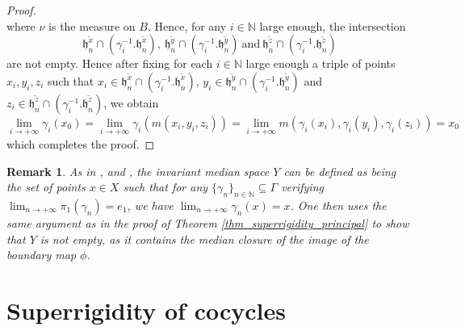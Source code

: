 \documentclass{amsart}
\numberwithin{equation}{section}
\newtheorem{rmk}[thm]{Remark}
\newcommand{\hh}{\mathfrak{h}}    %
\newcommand{\NN}{\mathbb{N}}      %
\theoremstyle{definition}
\begin{document}
\begin{proof}
\[        \]
        where $\nu$ is the measure on $B$. Hence, for any $i\in\NN$ large enough, the intersection 
       \[
       \hh_n^{\tilde{x}}\cap (\gamma_i^{-1}.\hh_n^{\tilde{x}}),\ \hh_n^{\tilde{y}}\cap (\gamma_i^{-1}.\hh_n^{\tilde{y}})\ \text{and}\ \hh_n^{\tilde{z}}\cap (\gamma_i^{-1}.\hh_n^{\tilde{z}})
       \]
        are not empty. Hence after fixing for each $i\in\NN$ large enough a triple of points $x_i,y_i,z_i$ such that $x_i\in \hh_n^{\tilde{x}}\cap (\gamma_i^{-1}.\hh_n^{{\tilde{x}}})$, $y_i\in \hh_n^{\tilde{y}}\cap (\gamma_i^{-1}.\hh_n^{\tilde{y}})$ and $z_i\in \hh_n^{\tilde{z}}\cap (\gamma_i^{-1}.\hh_n^{\tilde{z}})$, we obtain
         \[
        \lim_{i\rightarrow +\infty} \gamma_i(x_0)=\lim_{i\rightarrow +\infty} \gamma_i(m(x_i,y_i,z_i))=\lim_{i\rightarrow +\infty} m(\gamma_i(x_i),\gamma_i(y_i),\gamma_i(z_i)) =x_0
        \]
        which completes the proof.
        \end{proof}

        \begin{rmk}
           As in \cite{Shalom-superrigidity}, \cite{ChaIF} and \cite{Fior_superrigidity}, the invariant median space $Y$ can be defined as being the set of points $x\in X$ such that for any $\{\gamma_n\}_{n\in\NN}\subseteq \Gamma$ verifying $\displaystyle{\lim_{n \to +\infty} \pi_1(\gamma_n)=e_1}$, we have $\displaystyle{\lim_{n \to +\infty} \gamma_n(x)=x}$. One then uses the same argument as in the proof of Theorem \ref{thm_superrigidity_principal} to show that $Y$ is not empty, as it contains the median closure of the image of the boundary map $\phi$. 
        \end{rmk}
    



\section{Superrigidity of cocycles}\label{section_superrigidity_of_cocycles}
\end{document}
